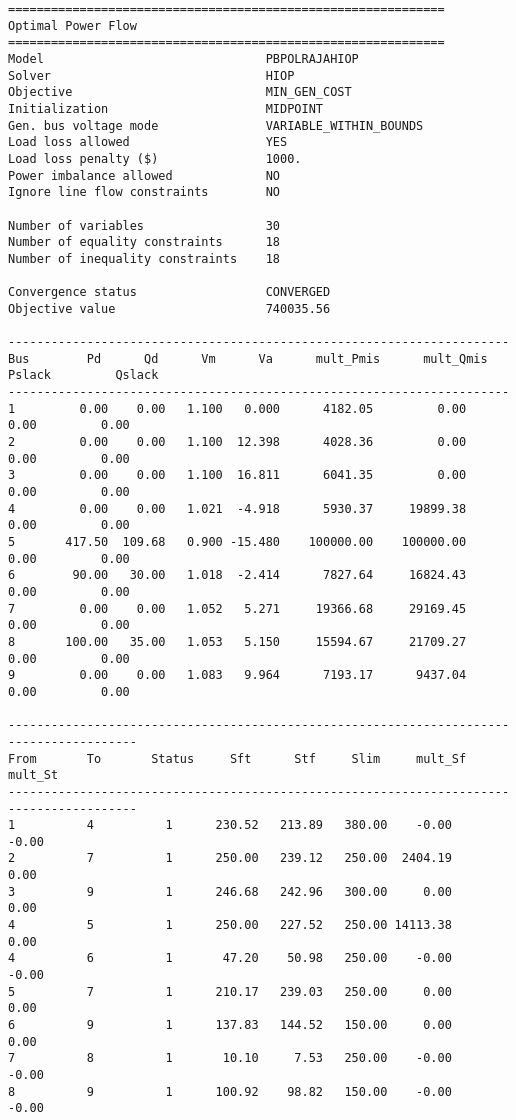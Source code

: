 \begin{lstlisting}
=============================================================
Optimal Power Flow
=============================================================
Model                               PBPOLRAJAHIOP
Solver                              HIOP
Objective                           MIN_GEN_COST
Initialization                      MIDPOINT
Gen. bus voltage mode               VARIABLE_WITHIN_BOUNDS
Load loss allowed                   YES
Load loss penalty ($)               1000.
Power imbalance allowed             NO
Ignore line flow constraints        NO

Number of variables                 30
Number of equality constraints      18
Number of inequality constraints    18

Convergence status                  CONVERGED
Objective value                     740035.56

----------------------------------------------------------------------
Bus        Pd      Qd      Vm      Va      mult_Pmis      mult_Qmis      Pslack         Qslack        
----------------------------------------------------------------------
1         0.00    0.00   1.100   0.000      4182.05         0.00         0.00         0.00
2         0.00    0.00   1.100  12.398      4028.36         0.00         0.00         0.00
3         0.00    0.00   1.100  16.811      6041.35         0.00         0.00         0.00
4         0.00    0.00   1.021  -4.918      5930.37     19899.38         0.00         0.00
5       417.50  109.68   0.900 -15.480    100000.00    100000.00         0.00         0.00
6        90.00   30.00   1.018  -2.414      7827.64     16824.43         0.00         0.00
7         0.00    0.00   1.052   5.271     19366.68     29169.45         0.00         0.00
8       100.00   35.00   1.053   5.150     15594.67     21709.27         0.00         0.00
9         0.00    0.00   1.083   9.964      7193.17      9437.04         0.00         0.00

----------------------------------------------------------------------------------------
From       To       Status     Sft      Stf     Slim     mult_Sf  mult_St 
----------------------------------------------------------------------------------------
1          4          1      230.52   213.89   380.00    -0.00    -0.00
2          7          1      250.00   239.12   250.00  2404.19     0.00
3          9          1      246.68   242.96   300.00     0.00     0.00
4          5          1      250.00   227.52   250.00 14113.38     0.00
4          6          1       47.20    50.98   250.00    -0.00    -0.00
5          7          1      210.17   239.03   250.00     0.00     0.00
6          9          1      137.83   144.52   150.00     0.00     0.00
7          8          1       10.10     7.53   250.00    -0.00    -0.00
8          9          1      100.92    98.82   150.00    -0.00    -0.00


\end{lstlisting}

